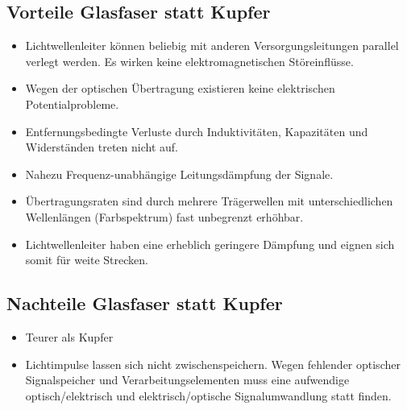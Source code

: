 \documentclass[12pt,a4paper]{article}
\begin{document}
		\subsection{Vorteile Glasfaser statt Kupfer}
		\begin{itemize}
			\item Lichtwellenleiter können beliebig mit anderen Versorgungsleitungen parallel verlegt werden. Es wirken keine elektromagnetischen Störeinflüsse.
			\item Wegen der optischen Übertragung existieren keine elektrischen Potentialprobleme.
			\item Entfernungsbedingte Verluste durch Induktivitäten, Kapazitäten und Widerständen treten nicht auf.
			\item Nahezu Frequenz-unabhängige Leitungsdämpfung der Signale.
			\item Übertragungsraten sind durch mehrere Trägerwellen mit unterschiedlichen Wellenlängen (Farbspektrum) fast unbegrenzt erhöhbar.
			\item Lichtwellenleiter haben eine erheblich geringere Dämpfung und eignen sich somit für weite Strecken.
		\end{itemize}

		\subsection{Nachteile Glasfaser statt Kupfer}
		\begin{itemize}
			\item Teurer als Kupfer
			\item Lichtimpulse lassen sich nicht zwischenspeichern. Wegen fehlender optischer Signalspeicher und Verarbeitungselementen muss eine aufwendige optisch/elektrisch und elektrisch/optische Signalumwandlung statt finden.
		\end{itemize}
	
\end{document}
